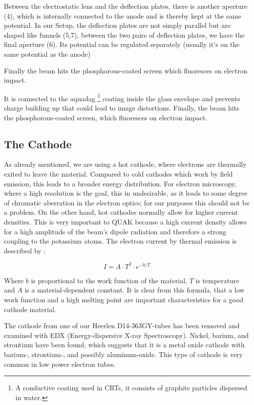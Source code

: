 Between the electrostatic lens and the deflection plates, there is another aperture (4), which is internally connected to the anode and is thereby kept at the same potential. In our Setup, the deflection plates are not simply parallel but are shaped like funnels (5,7), between the two pairs of deflection plates, we have the final aperture (6). Its potential can be regulated separately (usually it's on the same potential as the anode) 


Finally the beam hits the phosphorous-coated screen which fluoresces on electron impact.

It is connected to the aquadag \footnote{A conductive coating used in CRTs, it consists of graphite particles dispersed in water.} coating inside the glass envelope and prevents charge building up that could lead to image distortions. 
Finally, the beam hits the phosphorous-coated screen, which fluoresces on electron impact.

\subsection{The Cathode}


As already mentioned, we are using a hot cathode, where electrons are thermally exited  to leave the material. Compared to cold cathodes which work by field emission, this leads to a broader energy distribution. For electron microscopy, where a high resolution is the goal, this in undesirable, as it leads to some degree of chromatic aberration in the electron optics; for our purposes this should not be a problem. On the other hand, hot cathodes normally allow for higher current densities. This is very important to QUAK because a high current density allows for a high amplitude of the beam's dipole radiation and therefore a strong coupling to the potassium atoms. The  electron current by thermal emission is described by \cite[chp 3.2.3]{Whitaker}:

\begin{equation}\label{eq:thermionic_current}
I=A\cdot T^2 \cdot e^{-b/T}
\end{equation}

Where $b$ is proportional to the work function of the material, $T$ is temperature and $A$ is a material-dependent constant. It is clear from this formula, that a low work function and a high melting point are important characteristics for a good cathode material. 

The cathode from one of our Heerlen D14-363GY-tubes has been removed and examined with EDX (Energy-dispersive X-ray Spectroscopy). Nickel, barium, and strontium have been found, which suggests that it is a metal oxide cathode with barium-, strontium-, and possibly aluminum-oxide. This type of cathode is very common in low power electron tubes.

